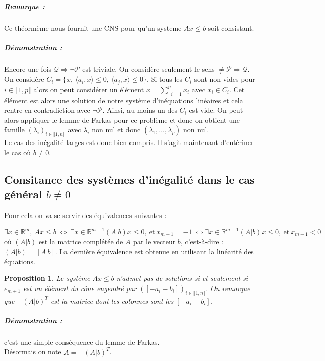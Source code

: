 \documentclass[10pt,a4paper]{article}
\newtheorem{thm}{Théorème}
\newtheorem{prop}{Proposition}
\begin{document}
\subparagraph{Remarque :}
  Ce théormème nous fournit une CNS pour qu'un systeme $Ax \leq b$ soit consistant.

\subparagraph{Démonstration :}
  Encore une fois $\mathcal{Q} \Rightarrow \neg \mathcal{P}$ est triviale.
  On considère seulement le sens $\neq \mathcal{P} \Rightarrow \mathcal{Q}$.
  On considère $C_i=\lbrace
  x, \ \langle a_i,x \rangle \le 0, \ \langle a_j,x \rangle \le 0\rbrace$.
  Si tous les $C_i$ sont non vides pour $i \in \llbracket 1,p \rrbracket$ alors on peut considérer un élément $x=\underset{i=1}{\overset{p}{\sum}}x_i$ avec $x_i \in C_i$.
  Cet élément est alors une solution de notre système d'inéquations linéaires et cela rentre en contradiction avec $\neg \mathcal{P}$.
  Ainsi, au moins un des $C_i$ est vide.
  On peut alors appliquer le lemme de Farkas pour ce problème et donc on obtient une famille $(\lambda_i)_{i \in \llbracket 1,n \rrbracket}$ avec $\lambda_i$ non nul et donc $(\lambda_1, \dots, \lambda_p)$ non nul.
  \\


Le cas des inégalité larges est donc bien compris.
Il s'agit maintenant d'entériner le cas où $b \neq 0$.

\subsection{Consitance des systèmes d'inégalité dans le cas général $b \neq 0$}

Pour cela on va se servir des équivalences suivantes :

\begin{equation}
\exists x \in \mathbb{R}^m, \ Ax \le b \ \Leftrightarrow \ \exists x \in \mathbb{R}^{m+1}(A\vert b)x\le 0, \ \text{et} \ x_{m+1}=-1 \ \Leftrightarrow \exists x \in \mathbb{R}^{m+1}(A\vert b)x\le 0, \ \text{et} \ x_{m+1}<0
\end{equation}
où $(A \vert b)$ est la matrice complétée de $A$ par le vecteur $b$, c'est-à-dire : $(A\vert b)= [A \ b ]$.
La dernière équivalence est obtenue en utilisant la linéarité des équations.

\begin{prop}
Le système $Ax \le b$ n'admet pas de solutions si et seulement si $e_{m+1}$ est un élément du cône engendré par  $([-a_i -b_i])_{i \in \llbracket 1,n \rrbracket}$.
On remarque que $-(A \vert b)^T$ est la matrice dont les colonnes sont les $[-a_i -b_i]$.
\end{prop}
\subparagraph{Démonstration :} c'est une simple conséquence du lemme de Farkas.\\
Désormais on note $\tilde{A}=-(A \vert b)^T$.
\end{document}
